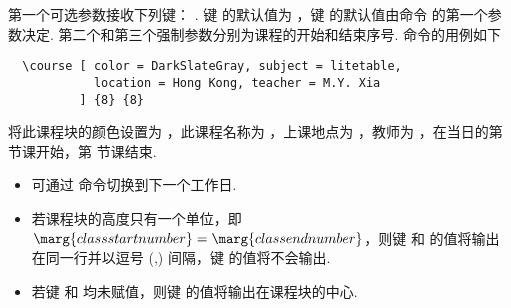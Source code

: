 \documentclass[letterpaper]{l3doc}
\begin{document}
第一个可选参数接收下列键：    . 键  的默认值为 ，键  的默认值由命令  的第一个参数决定. 第二个和第三个强制参数分别为课程的开始和结束序号.  命令的用例如下

\begin{Verbatim}
  \course [ color = DarkSlateGray, subject = litetable,
            location = Hong Kong, teacher = M.Y. Xia
          ] {8} {8}
\end{Verbatim}

\begin{center}
  \noindent\fbox
  {
    \parbox{.96\linewidth}
    {
      将此课程块的颜色设置为 ，此课程名称为 ，上课地点为 ，教师为 ，在当日的第  节课开始，第  节课结束.
    }
  }
\end{center}

\begin{itemize}
  \item 可通过  命令切换到下一个工作日.
  \item 若课程块的高度只有一个单位，即$\marg{class start number} = \marg{class end number}$，则键  和  的值将输出在同一行并以逗号 (,) 间隔，键  的值将不会输出.
  \item 若键  和  均未赋值，则键  的值将输出在课程块的中心.
\end{itemize}


\end{document}
